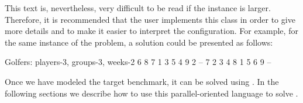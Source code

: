 This text is, nevertheless, very difficult to be read if the instance is larger. Therefore, it is recommended that the user implements this class in order to give more details and to make it easier to interpret the configuration. For example, for the same instance of the problem, a solution could be presented as follows:

\begin{BGVerbatim}
Golfers: players-3, groups-3, weeks-2
6	8	7	
1	3	5	
4	9	2	
--
7	2	3	
4	8	1	
5	6	9	
--
\end{BGVerbatim}

Once we have modeled the target benchmark, it can be solved using \posl{}. In the following sections we describe how to use this parallel-oriented language to solve \CSPs.